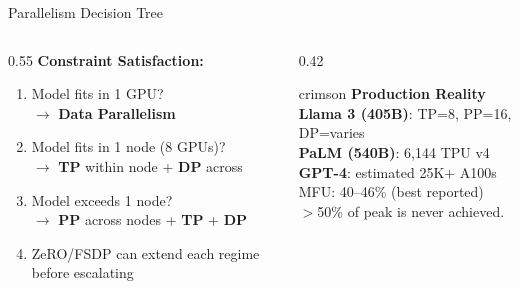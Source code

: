 \documentclass[aspectratio=169, 12pt]{beamer}
\begin{document}
\begin{frame}{Parallelism Decision Tree}

\small
\begin{columns}[T]
  \begin{column}{0.55\textwidth}
    \textbf{Constraint Satisfaction:}

    \vspace{0.15cm}
    \begin{enumerate}\setlength\itemsep{2pt}
      \item {\footnotesize Model fits in 1 GPU?\\$\to$ \textcolor{computestroke}{\textbf{Data Parallelism}}}
      \item {\footnotesize Model fits in 1 node (8 GPUs)?\\$\to$ \textcolor{computestroke}{\textbf{TP}} within node + \textcolor{routingstroke}{\textbf{DP}} across}
      \item {\footnotesize Model exceeds 1 node?\\$\to$ \textcolor{datastroke}{\textbf{PP}} across nodes + \textcolor{computestroke}{\textbf{TP}} + \textcolor{routingstroke}{\textbf{DP}}}
      \item {\footnotesize ZeRO/FSDP can extend each regime before escalating}
    \end{enumerate}
  \end{column}
  \begin{column}{0.42\textwidth}
    \begin{mlsyscard}{crimson}
    \textbf{Production Reality}\\[0.1cm]
    {\footnotesize
    \textbf{Llama 3 (405B)}: TP=8, PP=16, DP=varies\\
    \textbf{PaLM (540B)}: 6,144 TPU v4\\
    \textbf{GPT-4}: estimated 25K+ A100s\\[0.1cm]
    MFU: 40--46\% (best reported)\\
    \textcolor{errorstroke}{$>$50\% of peak is never achieved.}
    }
    \end{mlsyscard}
  \end{column}
\end{columns}

\end{frame}
\end{document}
